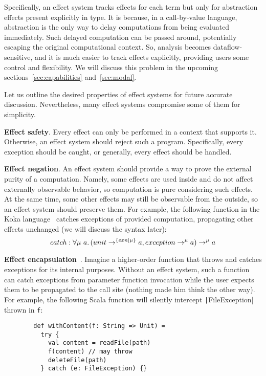 \documentclass[conference]{IEEEtran}
\newcommand{\ap}{~}
\begin{document}
    Specifically, an effect system tracks effects for each term but only for abstraction effects present explicitly in type.
    It is because, in a call-by-value language, abstraction is the only way to delay computations from being evaluated immediately.
    Such delayed computation can be passed around, potentially escaping the original computational context.
    So, analysis becomes dataflow-sensitive, and it is much easier to track effects explicitly, providing users some control and flexibility.
    We will discuss this problem in the upcoming sections~\ref{sec:capabilities} and~\ref{sec:modal}.


    Let us outline the desired properties of effect systems for future accurate discussion.
    Nevertheless, many effect systems compromise some of them for simplicity.

    \textbf{Effect safety}.
    Every effect can only be performed in a context that supports it.
    Otherwise, an effect system should reject such a program.
    Specifically, every exception should be caught, or generally, every effect should be handled.

    \textbf{Effect negation}.
    An effect system should provide a way to prove the external purity of a computation.
    Namely, some effects are used inside and do not affect externally observable behavior, so computation is pure considering such effects.
    At the same time, some other effects may still be observable from the outside, so an effect system should preserve them.
    For example, the following function in the Koka language~\cite{leijen2014koka, leijen2017type} catches exceptions of provided computation, propagating other effects unchanged (we will discuss the syntax later):
    \[catch : \forall \mu\ap a\ldotp (unit\to^{\{exn|\mu\}} a, exception \to^{\mu} a) \to^\mu a\]

    \textbf{Effect encapsulation}~\cite{lindley2018encapsulating}.
    Imagine a higher-order function that throws and catches exceptions for its internal purposes.
    Without an effect system, such a function can catch exceptions from parameter function invocation while the user expects them to be propagated to the call site (nothing made him think the other way).
    For example, the following Scala function will silently intercept \texttt|FileException| thrown in \texttt{f}:
    \begin{verbatim}
        def withContent(f: String => Unit) =
          try {
            val content = readFile(path)
            f(content) // may throw
            deleteFile(path)
          } catch (e: FileException) {}
    \end{verbatim}
\end{document}
